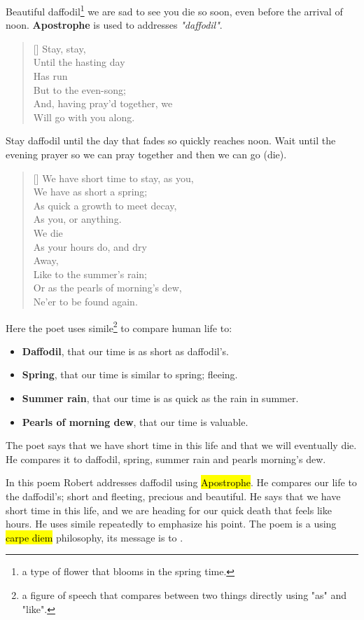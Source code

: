 Beautiful daffodil\footnote{a type of flower that blooms in the spring time.} we 
are sad to see you die so soon, even before the arrival of noon. \textbf{Apostrophe}
is used to addresses \textit{"daffodil"}.

\begin{verse}[\versewidth]
{\fontverse
Stay, stay,\\
Until the hasting day\\
Has run\\
But to the even-song;\\
And, having pray'd together, we\\
Will go with you along.
} 
\end{verse}

Stay daffodil until the day that fades so quickly reaches noon. Wait until the evening 
prayer so we can pray together and then we can go (die). 

\begin{verse}[\versewidth]
{\fontverse
We have short time to stay, as you,\\
We have as short a spring;\\
As quick a growth to meet decay,\\
As you, or anything.\\
We die\\
As your hours do, and dry\\
Away,\\
Like to the summer's rain;\\
Or as the pearls of morning's dew,\\
Ne'er to be found again.
} 
\end{verse}

Here the poet uses simile\footnote{a figure of speech that compares between 
two things directly using "as" and "like".} to compare human life to:

\begin{itemize}
  \item \textbf{Daffodil}, that our time is as short as daffodil's.
  \item \textbf{Spring}, that our time is similar to spring; fleeing.
  \item \textbf{Summer rain}, that our time is as quick as the rain in summer.
  \item \textbf{Pearls of morning dew}, that our time is valuable.
\end{itemize}

The poet says that we have short time in this life and that we will eventually die. 
He compares it to daffodil, spring, summer rain and pearls morning's dew. 

In this poem Robert addresses daffodil using \hl{Apostrophe}. He compares
our life to the daffodil's; short and fleeting, precious and beautiful.
He says that we have short time in this life, and we are heading for our quick
death that feels like hours. He uses simile repeatedly to emphasize his point.
The poem is a  using \hl{carpe diem} philosophy, its message is to
.

